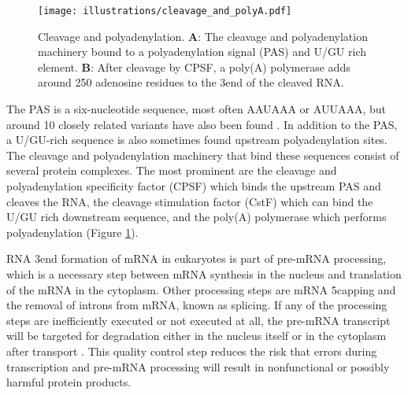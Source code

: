 \begin{figure}[h]
	\begin{center}
		\texttt{[image: illustrations/cleavage\_and\_polyA.pdf]}
	\end{center}
	\caption{Cleavage and polyadenylation. \textbf{A}: The cleavage and
	polyadenylation machinery bound to a polyadenylation signal (PAS) and U/GU
	rich element. \textbf{B}: After cleavage by CPSF, a poly(A) polymerase adds
	around 250 adenosine residues to the 3\protect\ppp end of the cleaved RNA.}
	\label{fig:cleavage}
\end{figure}

The PAS is a six-nucleotide sequence, most often AAUAAA or AUUAAA, but around
10 closely related variants have also been found
\cite{beaudoing_patterns_2000}. In addition to the PAS, a U/GU-rich sequence is
also sometimes found upstream polyadenylation sites. The cleavage and polyadenylation
machinery that bind these sequences consist of several protein complexes. The
most prominent are the cleavage and polyadenylation specificity factor (CPSF)
which binds the upstream PAS and cleaves the RNA, the cleavage stimulation
factor (CstF) which can bind the U/GU rich downstream sequence, and the poly(A)
polymerase which performs polyadenylation \cite{lutz_alternative_2008} (Figure
\ref{fig:cleavage}).

RNA 3\ppp end formation of mRNA in eukaryotes is part of pre-mRNA processing,
which is a necessary step between mRNA synthesis in the nucleus and translation
of the mRNA in the cytoplasm. Other processing steps are mRNA 5\ppp capping and
the removal of introns from mRNA, known as splicing. If any of the processing
steps are inefficiently executed or not executed at all, the pre-mRNA
transcript will be targeted for degradation either in the nucleus itself or in
the cytoplasm after transport \cite{doma_rna_2007}. This quality control step
reduces the risk that errors during transcription and pre-mRNA processing will
result in nonfunctional or possibly harmful protein products.


